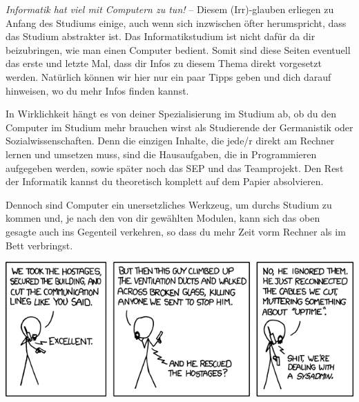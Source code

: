 
\begin{multicols}{2}
\emph{Informatik hat viel mit Computern zu tun!} -- Diesem (Irr)-glauben erliegen zu Anfang des Studiums einige, auch wenn sich inzwischen öfter herumspricht, dass das Studium abstrakter ist. Das Informatikstudium ist nicht dafür da dir beizubringen, wie man einen Computer bedient. Somit sind diese Seiten eventuell das erste und letzte Mal, dass dir Infos zu diesem Thema direkt vorgesetzt werden. Natürlich können wir hier nur ein paar Tipps geben und dich darauf hinweisen, wo du mehr Infos finden kannst.

In Wirklichkeit hängt es von deiner Spezialisierung im Studium ab, ob du den Computer im Studium mehr brauchen wirst als Studierende der Germanistik oder Sozialwissenschaften. Denn die einzigen Inhalte, die jede/r direkt am Rechner lernen und umsetzen muss, sind die Hausaufgaben, die in Programmieren aufgegeben werden, sowie später noch das SEP und das Teamprojekt. Den Rest der Informatik kannst du theoretisch komplett auf dem Papier absolvieren.

Dennoch sind Computer ein unersetzliches Werkzeug, um durchs Studium zu kommen und, je nach den von dir gewählten Modulen, kann sich das oben gesagte auch ins Gegenteil verkehren, so dass du mehr Zeit vorm Rechner als im Bett verbringst.






\end{multicols}

\vspace{4cm}
\begin{center}
		\includegraphics[totalheight=6cm]{bilder/XKCD/devotion_to_duty}
\end{center}
